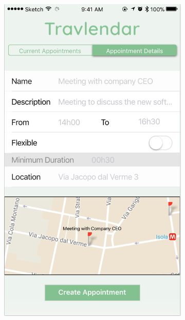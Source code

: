 \documentclass[12pt]{article}
\begin{document}
\begin{figure}[H]
\centering
    \begin{subfigure}{.4\textwidth}
        \includegraphics[scale=0.43]{interfaceNewAppointment.png}
        \label{fig:appointmentScreen}
    \end{subfigure}%
    \begin{subfigure}{.4\textwidth}

\end{subfigure}
\end{figure}
\end{document}
